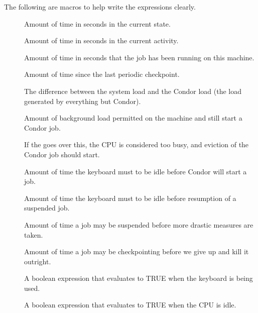 The following are macros to help write the expressions
clearly.

\begin{description}
  
\item[] Amount of time in seconds in the current state.

\item[] Amount of time in seconds in the current activity. 

\item[] Amount of time in seconds that the job has been
  running on this machine.

\item[] Amount of time since the last periodic checkpoint.

\item[] The difference between the system load and
  the Condor load (the load generated by everything but Condor).

\item[] Amount of background load permitted
  on the machine and still start a Condor job.

\item[] If the  goes over
  this, the CPU is considered too busy, and eviction of the Condor
  job should start. 

\item[] Amount of time the keyboard must to be idle
  before Condor will start a job.

\item[] Amount of time the keyboard must to be idle
  before resumption of a suspended job.

\item[] Amount of time a job may be
  suspended before more drastic measures are taken.

\item[] Amount of time a job may be
  checkpointing before we give up and kill it outright.

\item[] A boolean expression that evaluates to TRUE
    when the keyboard is being used.

\item[] A boolean expression that evaluates to TRUE
    when the CPU is idle.


\end{description}
